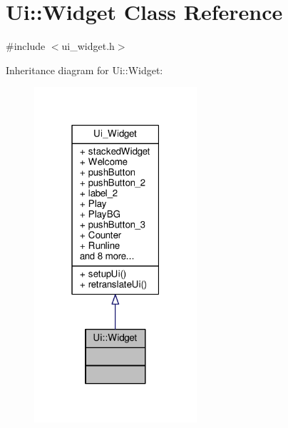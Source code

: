 \hypertarget{classUi_1_1Widget}{}\section{Ui\+:\+:Widget Class Reference}
\label{classUi_1_1Widget}


{\ttfamily \#include $<$ui\+\_\+widget.\+h$>$}



Inheritance diagram for Ui\+:\+:Widget\+:
\nopagebreak
\begin{figure}[H]
\begin{center}
\leavevmode
\includegraphics[width=171pt]{classUi_1_1Widget__inherit__graph}
\end{center}
\end{figure}



